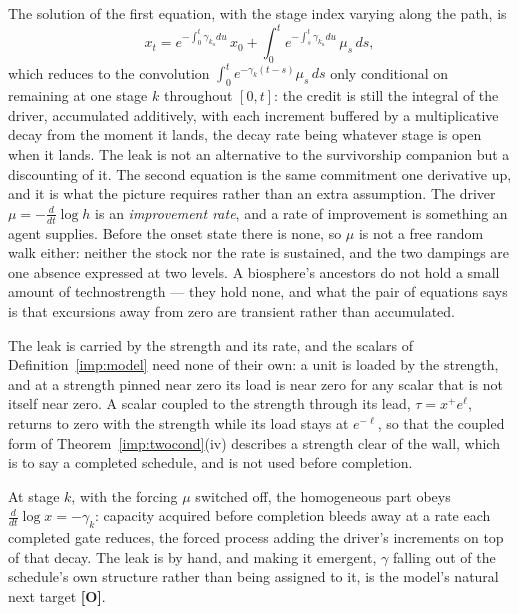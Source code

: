 The solution of the first equation, with the stage index varying along
the path, is
\[
x_t=e^{-\int_0^t\gamma_{k_u}du}\,x_0+\int_0^te^{-\int_s^t\gamma_{k_u}du}\,\mu_s\,ds,
\]
which reduces to the convolution $\int_0^te^{-\gamma_k(t-s)}\mu_s\,ds$
only conditional on remaining at one stage $k$ throughout $[0,t]$: the
credit is still the integral of the driver, accumulated additively,
with each increment buffered by a multiplicative decay from the moment
it lands, the decay rate being whatever stage is open when it lands. The leak is
not an alternative to the survivorship companion \cite{GoldenSurvivorship} but a discounting of it. The second equation is the same commitment one derivative up, and it is
what the picture requires rather than an extra assumption. The driver
$\mu=-\tfrac{d}{dt}\log h$ is an \emph{improvement rate}, and a rate of
improvement is something an agent supplies. Before the onset state there
is none, so $\mu$ is not a free random walk either: neither the stock nor
the rate is sustained, and the two dampings are one absence expressed at
two levels. A biosphere's ancestors do not hold a small amount of
technostrength --- they hold none, and what the pair of equations says is
that excursions away from zero are transient rather than accumulated.

The leak is carried by the strength and its rate, and the scalars of
Definition~\ref{imp:model} need none of their own: a unit is loaded by the
strength, and at a strength pinned near zero its load is near zero for
any scalar that is not itself near zero. A scalar coupled to the strength through its lead,
$\tau=x^+e^{\ell}$, returns to zero with the strength while its load stays
at $e^{-\ell}$, so that the coupled form of Theorem~\ref{imp:twocond}(iv)
describes a strength clear of the wall, which is to say a completed
schedule, and is not used before completion.

At stage $k$, with the forcing $\mu$ switched off, the homogeneous part
obeys $\tfrac{d}{dt}\log x=-\gamma_k$: capacity acquired before
completion bleeds away at a rate each completed gate reduces, the
forced process adding the driver's increments on top of that decay. The leak is by hand, and making it emergent, $\gamma$
falling out of the schedule's own structure rather than being assigned
to it, is the model's natural next target \textbf{[O]}.

